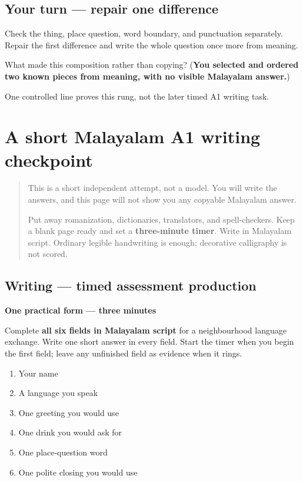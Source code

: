 \subsection*{Your turn — repair one difference}
Check the thing, place question, word boundary, and punctuation separately. Repair the first difference and write the whole question once more from meaning.

\begin{tcolorbox}[breakable,colback=teal!4,colframe=teal!35!black,title={Before you move on}]
What made this composition rather than copying? (\textbf{You selected and ordered two known pieces from meaning, with no visible Malayalam answer.})

One controlled line proves this rung, not the later timed A1 writing task.
\end{tcolorbox}
\section[(short timed A1 writing checkpoint)]{A short Malayalam A1 writing checkpoint}

\label{lesson:ML-W108-a1-timed-production}



\begin{quote}
This is a short independent attempt, not a model. You will write the answers, and this page will not show you any copyable Malayalam answer.

Put away romanization, dictionaries, translators, and spell-checkers. Keep a blank page ready and set a \textbf{three-minute timer}. Write in Malayalam script. Ordinary legible handwriting is enough; decorative calligraphy is not scored.
\end{quote}

\subsection*{Writing — timed assessment production}
\textbf{One practical form — three minutes}

Complete \textbf{all six fields in Malayalam script} for a neighbourhood language exchange. Write one short answer in every field. Start the timer when you begin the first field; leave any unfinished field as evidence when it rings.

\begin{enumerate}
\raggedright
  \item Your name
  \item A language you speak
  \item One greeting you would use
  \item One drink you would ask for
  \item One place-question word
  \item One polite closing you would use
\end{enumerate}

